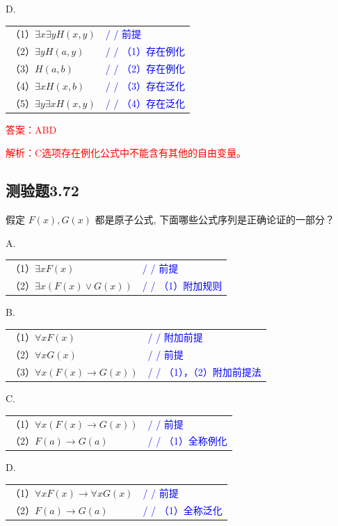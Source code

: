 \documentclass[UTF8, heading=true]{ctexart}
\begin{document}
D. 

\begin{tabular}{ll}
  （1）$\exists x \exists y H(x, y)$ & \textcolor{blue}{/ / 前提} \\
  （2）$\exists y H(a, y)$ & \textcolor{blue}{/ / （1）存在例化} \\
  （3）$H(a, b)$ & \textcolor{blue}{/ / （2）存在例化} \\
  （4）$\exists x H(x, b)$ & \textcolor{blue}{/ / （3）存在泛化} \\
  （5）$\exists y \exists x H(x, y)$ & \textcolor{blue}{/ / （4）存在泛化}
\end{tabular}

\textcolor{red}{答案：ABD}

\textcolor{red}{解析：C选项存在例化公式中不能含有其他的自由变量。}

\subsection{测验题3.72}

假定 $F(x),G(x)$ 都是原子公式, 下面哪些公式序列是正确论证的一部分？

A. 

\begin{tabular}{ll}
  （1）$\exists x F(x)$ & \textcolor{blue}{/ / 前提} \\
  （2）$\exists x(F(x) \vee G(x))$ & \textcolor{blue}{/ / （1）附加规则}
\end{tabular}


B. 

\begin{tabular}{ll}
  （1）$\forall x F(x)$ & \textcolor{blue}{/ / 附加前提} \\
  （2）$\forall x G(x)$ & \textcolor{blue}{/ / 前提} \\
  （3）$\forall x(F(x) \rightarrow G(x))$ & \textcolor{blue}{/ / （1），（2）附加前提法}
\end{tabular}


C. 

\begin{tabular}{ll}
  （1）$\forall x(F(x) \rightarrow G(x))$ & \textcolor{blue}{/ / 前提} \\
  （2）$F(a) \rightarrow G(a)$ & \textcolor{blue}{/ / （1）全称例化}
\end{tabular}

D. 

\begin{tabular}{ll}
  （1）$\forall x F(x) \rightarrow \forall x G(x)$ & \textcolor{blue}{/ / 前提} \\
  （2）$F(a) \rightarrow G(a)$ & \textcolor{blue}{/ / （1）全称泛化}
\end{tabular}
\end{document}
